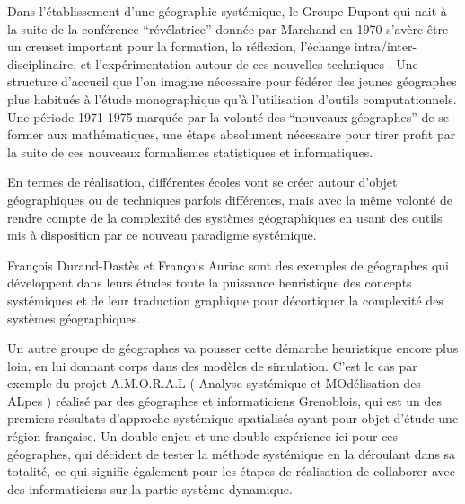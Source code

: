 
Dans l'établissement d'une géographie systémique, le Groupe Dupont qui nait à la suite de la conférence \enquote{révélatrice} donnée par Marchand en 1970 s'avère être un creuset important pour la formation, la réflexion, l'échange intra/inter-disciplinaire, et l'expérimentation autour de ces nouvelles techniques \autocites[2]{LeBerre1987}[125-128]{Pumain2002}. Une structure d'accueil que l'on imagine nécessaire pour fédérer des jeunes géographes plus habitués à l'étude monographique qu'à l'utilisation d'outils computationnels. Une période 1971-1975 marquée par la volonté des \enquote{nouveaux géographes} de se former aux mathématiques, une étape absolument nécessaire pour tirer profit par la suite de ces nouveaux formalismes statistiques et informatiques. 


En termes de réalisation, différentes écoles vont se créer autour d'objet géographiques ou de techniques parfois différentes, mais avec la même volonté de rendre compte de la complexité des systèmes géographiques en usant des outils mis à disposition par ce nouveau paradigme systémique.

François Durand-Dastès et François Auriac sont des exemples de géographes qui développent dans leurs études toute la puissance heuristique des concepts systémiques et de leur traduction graphique pour décortiquer la complexité des systèmes géographiques.

Un autre groupe de géographes va pousser cette démarche heuristique encore plus loin, en lui donnant corps dans des modèles de simulation. C'est le cas par exemple du projet A.M.O.R.A.L ( Analyse systémique et MOdélisation des ALpes ) réalisé par des géographes et informaticiens Grenoblois, qui est un des premiers résultats d'approche systémique spatialisés ayant pour objet d'étude une région française. Un double enjeu et une double expérience ici pour ces géographes, qui décident de tester la méthode systémique en la déroulant dans sa totalité, ce qui signifie également pour les étapes de réalisation de collaborer avec des informaticiens sur la partie système dynamique. \autocite{Guermond1984, LeBerre1987}


